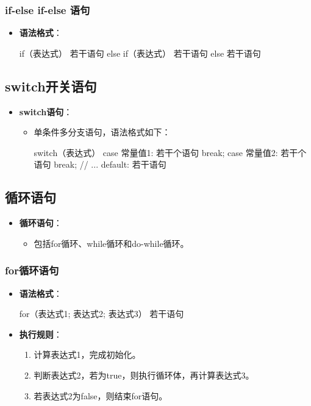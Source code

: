 \documentclass[a4paper, 10pt]{ctexart}
\begin{document}
\subsubsection{if-else if-else 语句}
\begin{itemize}
  \item \textbf{语法格式}：
  \begin{codeblock}
if（表达式） {
    若干语句
} else if（表达式） {
    若干语句
} else {
    若干语句
}
  \end{codeblock}
\end{itemize}

\subsection{switch开关语句}
\begin{itemize}
  \item \textbf{switch语句}：
  \begin{itemize}
    \item 单条件多分支语句，语法格式如下：
    \begin{codeblock}
switch（表达式） {
    case 常量值1:
        若干个语句
        break;
    case 常量值2:
        若干个语句
        break;
    // ...
    default:
        若干语句
}
    \end{codeblock}
  \end{itemize}
\end{itemize}

\subsection{循环语句}
\begin{itemize}
  \item \textbf{循环语句}：
  \begin{itemize}
    \item 包括for循环、while循环和do-while循环。
  \end{itemize}
\end{itemize}

\subsubsection{for循环语句}
\begin{itemize}
  \item \textbf{语法格式}：
  \begin{codeblock}
for（表达式1; 表达式2; 表达式3） {
    若干语句
}
  \end{codeblock}
  \item \textbf{执行规则}：
  \begin{enumerate}
    \item 计算表达式1，完成初始化。
    \item 判断表达式2，若为true，则执行循环体，再计算表达式3。
    \item 若表达式2为false，则结束for语句。
  \end{enumerate}
\end{itemize}
\end{document}
